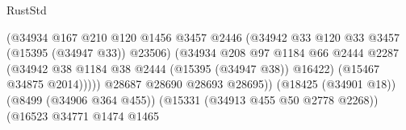 \begin{lexlean}{RustStd}
\begin{coremodule}
                                                        (@34934
                                                          @167
                                                          @210
                                                          @120
                                                          @1456
                                                          @3457
                                                          @2446
                                                          (@34942
                                                            @33
                                                            @120
                                                            @33
                                                            @3457
                                                            (@15395 (@34947 @33))
                                                            @23506)
                                                          (@34934
                                                            @208
                                                            @97
                                                            @1184
                                                            @66
                                                            @2444
                                                            @2287
                                                            (@34942
                                                              @38
                                                              @1184
                                                              @38
                                                              @2444
                                                              (@15395 (@34947 @38))
                                                              @16422)
                                                            (@15467 @34875 @2014)))))
                                                    @28687
                                                    @28690
                                                    @28693
                                                    @28695))
                                                (@18425 (@34901 @18))
                                                (@8499 (@34906 @364 @455))
                                                (@15331 (@34913 @455 @50 @2778 @2268))
                                                (@16523
                                                  @34771
                                                  @1474
                                                  @1465

\end{coremodule}
\end{lexlean}
